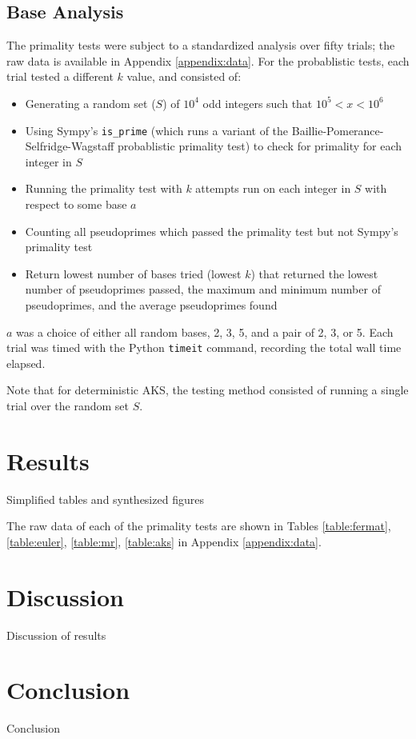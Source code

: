 \documentclass{article}
\begin{document}
\subsection{Base Analysis}
The primality tests were subject to a standardized analysis over fifty trials; the raw data is available in Appendix \ref{appendix:data}. For the probablistic tests, each trial tested a different $k$ value, and consisted of: %
\begin{itemize}
    \item{Generating a random set ($S$) of $10^4$ odd integers such that $10^5 < x < 10^6$}
    \item{Using Sympy's \texttt{is\_prime} (which runs a variant of the Baillie-Pomerance-Selfridge-Wagstaff probablistic primality test) to check for primality for each integer in $S$}
    \item{Running the primality test with $k$ attempts run on each integer in $S$ with respect to some base $a$}
    \item{Counting all pseudoprimes which passed the primality test but not Sympy's primality test}
    \item{Return lowest number of bases tried (lowest $k$) that returned the lowest number of pseudoprimes passed, the maximum and minimum number of pseudoprimes, and the average pseudoprimes found}
\end{itemize}
$a$ was a choice of either all random bases, 2, 3, 5, and a pair of 2, 3, or 5. Each trial was timed with the Python \texttt{timeit} command, recording the total wall time elapsed. 

Note that for deterministic AKS, the testing method consisted of running a single trial over the random set $S$.

\section{Results}
Simplified tables and synthesized figures

The raw data of each of the primality tests are shown in Tables \ref{table:fermat}, \ref{table:euler}, \ref{table:mr}, \ref{table:aks} in Appendix \ref{appendix:data}.

\section{Discussion}
Discussion of results

\section{Conclusion}
Conclusion
\end{document}
